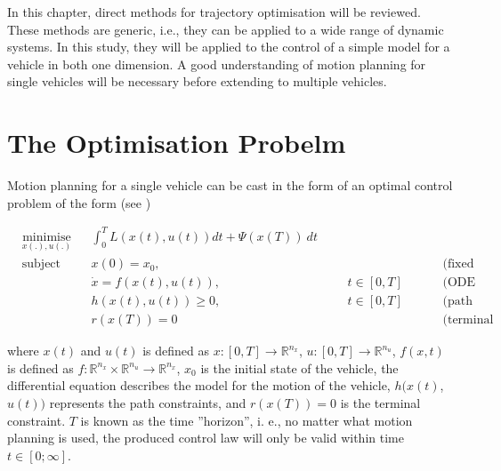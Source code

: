 %
\cleardoublepage%
\label{chap:theory}
 
\par In this chapter, direct methods for trajectory optimisation will be reviewed. These methods are generic, i.e., they can be applied to a wide range of dynamic systems. In this study, they will be applied to the control of a simple model for a vehicle in both one dimension. A good understanding of motion planning for single vehicles will be necessary before extending to multiple vehicles.

\section{The Optimisation Probelm}

\par Motion planning for a single vehicle can be cast in the form of an optimal control problem of the form (see \cite{diehl2006fast})

\begin{equation}
    \begin{aligned}
    & \underset{x(.),u(.)}{\text{minimise}} && \int_0^T L(x(t),u(t))dt + \Psi (x(T)) \ dt\\
    & \text{subject to}  && x(0) = x_0, &&& &&&& \text{(fixed initial value)} \\
        & && \dot{x} = f(x(t), u(t)), &&& t \in [0,T] &&&& \text{(ODE Model)}\\
        & && h(x(t),u(t)) \geq 0, &&&  t \in [0,T] &&&& \text{(path constraints)} &&&&&\\
        & && r(x(T)) = 0 &&& &&&& \text{(terminal constraints)} &&&&&
    \end{aligned}
    \label{eq:general_cost}
\end{equation}

where $x(t)$ and $u(t)$ is defined as $x:[0,T]\rightarrow \mathbb{R}^{n_x}$, $u:[0,T]\rightarrow \mathbb{R}^{n_u}$, $f(x,t)$ is defined as $f:\mathbb{R}^{n_x}\times \mathbb{R}^{n_u}\rightarrow \mathbb{R}^{n_x}$, $x_0$ is the initial state of the vehicle, the differential equation describes the model for the motion of the vehicle, $h(x(t)$, $u(t))$ represents the path constraints, and $r(x(T))=0$ is the terminal constraint. $T$ is known as the time ”horizon”, i. e., no matter what motion planning is used, the produced control law will only be valid within time $t\in[0;\infty]$.


